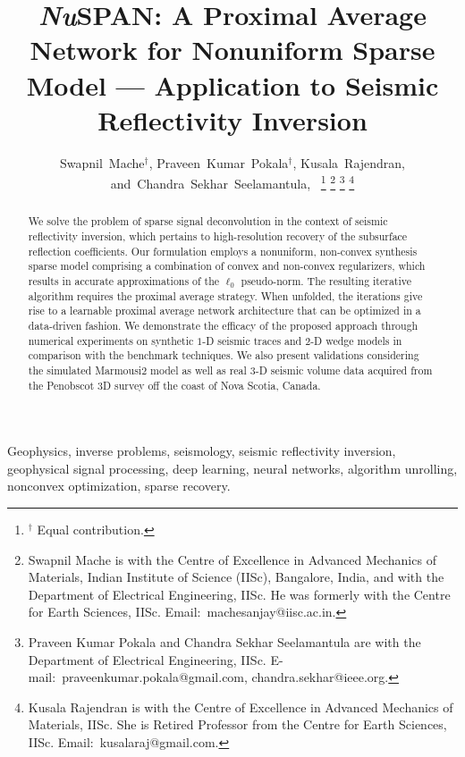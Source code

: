 \documentclass[journal]{IEEEtran}
\begin{document}
\title{{\it Nu}SPAN: A Proximal Average Network for Nonuniform Sparse Model --- Application to Seismic Reflectivity Inversion}

\author{Swapnil~Mache$^\dagger$,
        Praveen~Kumar~Pokala$^\dagger$,
        Kusala~Rajendran,
        and~Chandra~Sekhar~Seelamantula,~%
\thanks{$^\dagger$ Equal contribution.}%
\thanks{Swapnil Mache is with the Centre of Excellence in Advanced Mechanics of Materials, Indian Institute of Science (IISc), Bangalore, India, and with the Department of Electrical Engineering, IISc. He was formerly with the Centre for Earth Sciences, IISc. Email:~machesanjay@iisc.ac.in.}%
\thanks{Praveen Kumar Pokala and Chandra Sekhar Seelamantula are with the Department of Electrical Engineering, IISc. E-mail:~praveenkumar.pokala@gmail.com, chandra.sekhar@ieee.org. }%
\thanks{Kusala Rajendran is with the Centre of Excellence in Advanced Mechanics of Materials, IISc. She is Retired Professor from the Centre for Earth Sciences, IISc. Email:~kusalaraj@gmail.com.}
}

\maketitle

\begin{abstract}
    We solve the problem of sparse signal deconvolution in the context of seismic reflectivity inversion, which pertains to high-resolution recovery of the subsurface reflection coefficients. Our formulation employs a nonuniform, non-convex synthesis sparse model comprising a combination of convex and non-convex regularizers, which results in accurate approximations of the $\ell_0$ pseudo-norm. The resulting iterative algorithm requires the proximal average strategy. When unfolded, the iterations give rise to a learnable proximal average network architecture that can be optimized in a data-driven fashion. We demonstrate the efficacy of the proposed approach through numerical experiments on synthetic $1$-D seismic traces and $2$-D wedge models in comparison with the benchmark techniques. We also present validations considering the simulated Marmousi$2$ model as well as real $3$-D seismic volume data acquired from the Penobscot $3$D survey off the coast of Nova Scotia, Canada.
\end{abstract}

\begin{IEEEkeywords}
Geophysics, inverse problems, seismology, seismic reflectivity inversion, geophysical signal processing, deep learning, neural networks, algorithm unrolling, nonconvex optimization, sparse recovery.
\end{IEEEkeywords}
\end{document}
